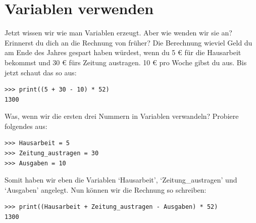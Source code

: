 \section{Variablen verwenden}

Jetzt wissen wir wie man Variablen erzeugt. Aber wie wenden wir sie an? Erinnerst du dich an die Rechnung von früher? Die Berechnung wieviel Geld du am Ende des Jahres gespart haben würdest, wenn du 5 € für die Hausarbeit bekommst und 30 € fürs Zeitung austragen. 10 € pro Woche gibst du aus. Bis jetzt schaut das so aus:

\begin{Verbatim}[frame=single]
>>> print((5 + 30 - 10) * 52)
1300
\end{Verbatim}

\noindent
Was, wenn wir die ersten drei Nummern in Variablen verwandeln? Probiere folgendes aus:

\begin{Verbatim}[frame=single]
>>> Hausarbeit = 5
>>> Zeitung_austragen = 30
>>> Ausgaben = 10
\end{Verbatim}

\noindent
Somit haben wir eben die Variablen `Hausarbeit', `Zeitung\_austragen' und `Ausgaben' angelegt. Nun können wir die Rechnung so schreiben:

\begin{Verbatim}[frame=single]
>>> print((Hausarbeit + Zeitung_austragen - Ausgaben) * 52)
1300
\end{Verbatim}

